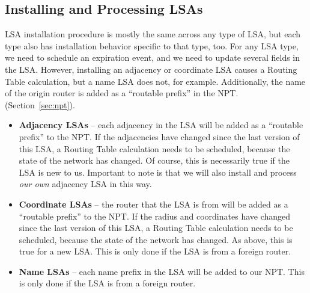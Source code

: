 \subsection{Installing and Processing LSAs}
LSA installation procedure is mostly the same across any type of LSA,
but each type also has installation behavior specific to that type,
too. For any LSA type, we need to schedule an expiration event, and we
need to update several fields in the LSA. However, installing an
adjacency or coordinate LSA causes a Routing Table calculation, but a
name LSA does not, for example.
Additionally, the name of the origin router is added as a ``routable prefix'' in the NPT. (Section~\ref{sec:npt}).
\begin{itemize}
  \item \textbf{Adjacency LSAs} -- each adjacency in the LSA will be
    added as a ``routable prefix'' to the NPT. If the adjacencies have
    changed since the last version of this LSA, a Routing Table
    calculation needs to be scheduled, because the state of the
    network has changed. Of course, this is necessarily true if the
    LSA is new to us. Important to note is that we will also install
    and process \emph{our own} adjacency LSA in this way.
  \item \textbf{Coordinate LSAs} -- the router that the LSA is from
    will be added as a ``routable prefix'' to the NPT. If the radius
    and coordinates have changed since the last version of this LSA, a
    Routing Table calculation needs to be scheduled, because the state
    of the network has changed. As above, this is true for a new
    LSA. This is only done if the LSA is from a foreign router.
  \item \textbf{Name LSAs} -- each name prefix in the LSA will be
    added to our NPT. This is only done if the LSA is from a foreign
    router.
\end{itemize}

